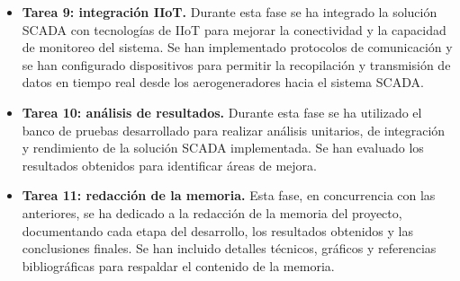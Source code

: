 \begin{itemize}
    \item \textbf{Tarea 9: integración IIoT.} Durante esta fase se ha integrado la solución \ac{SCADA} con tecnologías de \ac{IIoT} para mejorar la conectividad y la capacidad de monitoreo del sistema. Se han implementado protocolos de comunicación y se han configurado dispositivos para permitir la recopilación y transmisión de datos en tiempo real desde los aerogeneradores hacia el sistema \ac{SCADA}.
    \item \textbf{Tarea 10: análisis de resultados.} Durante esta fase se ha utilizado el banco de pruebas desarrollado para realizar análisis unitarios, de integración y rendimiento de la solución \ac{SCADA} implementada. Se han evaluado los resultados obtenidos para identificar áreas de mejora.
    \item \textbf{Tarea 11: redacción de la memoria.} Esta fase, en concurrencia con las anteriores, se ha dedicado a la redacción de la memoria del proyecto, documentando cada etapa del desarrollo, los resultados obtenidos y las conclusiones finales. Se han incluido detalles técnicos, gráficos y referencias bibliográficas para respaldar el contenido de la memoria.
\end{itemize}






